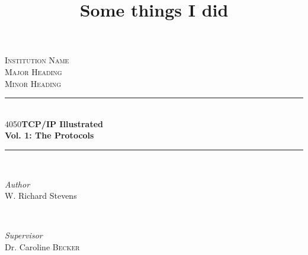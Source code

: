 \documentclass[12pt]{ctexbook}
\title{Some things I did}
\makeatletter
\newcommand\HUGE{\@setfontsize\Huge{40}{50}}
\makeatother
\begin{document}
\begin{titlepage} %
	\newcommand{\HRule}{\rule{\linewidth}{0.5mm}} %

	\center %


	\textsc{\LARGE Institution Name}\\[1.5cm] %

	\textsc{\Large Major Heading}\\[0.5cm] %

	\textsc{\large Minor Heading}\\[0.5cm] %


	\HRule\\[0.4cm]

	{\HUGE\bfseries TCP/IP Illustrated}\\[0.5cm] %
	{\huge\bfseries Vol. 1: The Protocols}\\[0.3cm] %

	\HRule\\[1.5cm]


	\begin{minipage}{0.4\textwidth}
		\begin{flushleft}
			\large
			\textit{Author}\\
      W. Richard Stevens
		\end{flushleft}
	\end{minipage}
	~
	\begin{minipage}{0.4\textwidth}
		\begin{flushright}
			\large
			\textit{Supervisor}\\
			Dr. Caroline \textsc{Becker} %
		\end{flushright}
	\end{minipage}



\end{titlepage}
\end{document}
